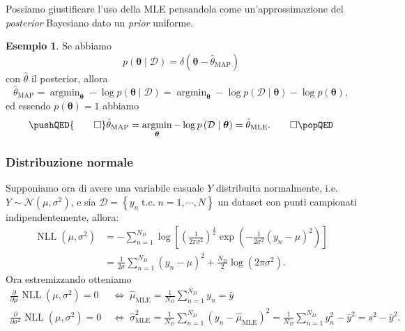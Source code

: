 \documentclass[10pt]{article}
\DeclareMathOperator*{\argmin}{argmin}
\DeclareMathOperator{\NLL}{NLL}
\newcommand{\ve}[1]{\bm{#1}}
\newcommand{\HALF}{\frac{1}{2}}
\newcommand{\cond}{\mid}
\newcommand{\pare}[1]{
	\ensuremath{\left(#1\right)}
}
\newcommand{\spare}[1]{
	\ensuremath{\left[#1\right]}
}
\newcommand{\pderiv}[3][]{
	\ensuremath{\frac{\partial^{#1}{#2}}{\partial{#3}^{#1}}}
}
\newcommand{\tc}{\ensuremath{\;\text{t.c.}\;}}
\newcommand{\MLE}{\ensuremath{\text{MLE}}}
\theoremstyle{definition}
\newtheorem{example}{Esempio}[section]
\begin{document}
Possiamo giustificare l'uso della MLE pensandola come un'approssimazione del \textit{posterior} Bayesiano dato un \textit{prior} uniforme.

\begin{example}
Se abbiamo
\[
p\pare{\ve{\theta}\cond\mathcal{D}} = \delta\pare{\ve{\theta}- \hat{\theta}_{\text{MAP}}}
\]
con $\hat{\theta}$ il posterior, allora
\[
\hat{\theta}_{\text{MAP}} = \argmin_{\ve{\theta}}-\log p\pare{\ve{\theta}\cond\mathcal{D}} = \argmin_{\ve{\theta}} -\log p\pare{\mathcal{D}\cond\ve{\theta}} -\log p\pare{\ve{\theta}},
\]
ed essendo $p\pare{\ve{\theta}} = 1$ abbiamo
\[
\pushQED{\qed}
\hat{\theta}_{\text{MAP}} = \argmin_{\ve{\theta}} -\log p\pare{\mathcal{D}\cond\ve{\theta}} = \hat{\theta}_{\text{MLE}}.\qedhere
\popQED
\]
\end{example}

\subsubsection{Distribuzione normale}
Supponiamo ora di avere una variabile casuale $Y$ distribuita normalmente, i.e.
$Y\sim \mathcal{N}\pare{\mu, \sigma^2}$, e sia $\mathcal{D} = \left\{ y_n \tc
n=1,\cdots,N \right\}$ un dataset con punti campionati indipendentemente,
allora:
\begin{equation}
\begin{split}
\NLL\pare{\mu, \sigma^2} &= -\sum_{n=1}^{N_D}\log\spare{\pare{\frac{1}{2\pi\sigma^2}}^\HALF \exp\pare{-\frac{1}{2\sigma^2}\pare{y_n-\mu}^2}} \\
&=\frac{1}{2\sigma}\sum_{n=1}^{N_D}\pare{y_n - \mu}^2 + \frac{N_D}{2}\log\pare{2\pi\sigma^2}.
\end{split}
\end{equation}
Ora estremizzando otteniamo
\begin{align}
\pderiv{}{\mu}\NLL\pare{\mu, \sigma^2} = 0 &\;\Longleftrightarrow\; \hat{\mu}_{\MLE} = \frac{1}{N_D}\sum_{n=1}^{N_D} y_n = \bar{y}\\
\pderiv{}{\sigma^2}\NLL\pare{\mu, \sigma^2} = 0 &\;\Longleftrightarrow\; \hat{\sigma}^2_\MLE = \frac{1}{N_D}\sum_{n=1}^{N_D}\pare{y_n - \hat{\mu}_\MLE}^2 = \frac{1}{N_D}\sum_{n=1}^{N_D}y_n^2 - \bar{y}^2 = s^2 - \bar{y}^2.
\end{align}
\end{document}
